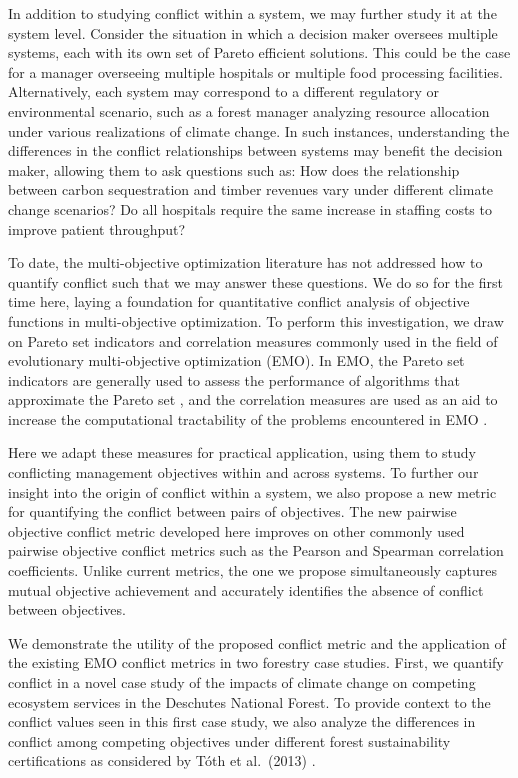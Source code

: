 In addition to studying conflict within a system, we may further study it at the system level. Consider the situation in which a decision maker oversees multiple systems, each with its own set of Pareto efficient solutions. This could be the case for a manager overseeing multiple hospitals or multiple food processing facilities. Alternatively, each system may correspond to a different regulatory or environmental scenario, such as a forest manager analyzing resource allocation under various realizations of climate change. In such instances, understanding the differences in the conflict relationships between systems may benefit the decision maker, allowing them to ask questions such as: How does the relationship between carbon sequestration and timber revenues vary under different climate change scenarios? Do all hospitals require the same increase in staffing costs to improve patient throughput?

To date, the multi-objective optimization literature has not addressed how to quantify conflict such that we may answer these questions. We do so for the first time here, laying a foundation for quantitative conflict analysis of objective functions in multi-objective optimization. To perform this investigation, we draw on Pareto set indicators and correlation measures commonly used in the field of evolutionary multi-objective optimization (EMO). In EMO, the Pareto set indicators are generally used to assess the performance of algorithms that approximate the Pareto set \cite{zitzler2003performance}, and the correlation measures are used as an aid to increase the computational tractability of the problems encountered in EMO \cite{brockhoff2006all}.

Here we adapt these measures for practical application, using them to study conflicting management objectives within and across systems. To further our insight into the origin of conflict within a system, we also propose a new metric for quantifying the conflict between pairs of objectives. The new pairwise objective conflict metric developed here improves on other commonly used pairwise objective conflict metrics such as the Pearson and Spearman correlation coefficients. Unlike current metrics, the one we propose simultaneously captures mutual objective achievement and accurately identifies the absence of conflict between objectives.

We demonstrate the utility of the proposed conflict metric and the application of the existing EMO conflict metrics in two forestry case studies. First,  we quantify conflict in a novel case study of the impacts of climate change on competing ecosystem services in the Deschutes National Forest. To provide context to the conflict values seen in this first case study, we also analyze the differences in conflict among competing objectives under different forest sustainability certifications as considered by T{\'o}th et al.\ (2013) \cite{toth2013ecosel}.

